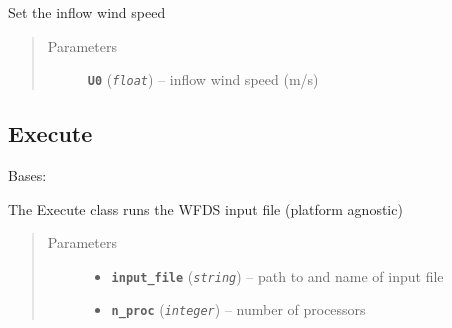\documentclass[letterpaper,10pt,english]{sphinxmanual}
\begin{document}
\begin{fulllineitems}
\begin{fulllineitems}
\begin{quote}
\begin{description}
\end{description}\end{quote}

\end{fulllineitems}


\begin{fulllineitems}
\label{wfds_WFDS:wfds.WFDS.set_wind_speed}
Set the inflow wind speed
\begin{quote}\begin{description}
\item[{Parameters}] \leavevmode
\textbf{\texttt{U0}} (\emph{\texttt{float}}) -- inflow wind speed (m/s)

\end{description}\end{quote}

\end{fulllineitems}


\end{fulllineitems}



\subsection{Execute}
\label{wfds_Execute:execute}\label{wfds_Execute::doc}

\begin{fulllineitems}
\label{wfds_Execute:wfds.Execute}
Bases: 

The Execute class runs the WFDS input file (platform agnostic)
\begin{quote}\begin{description}
\item[{Parameters}] \leavevmode\begin{itemize}
\item {} 
\textbf{\texttt{input\_file}} (\emph{\texttt{string}}) -- path to and name of input file

\item {} 
\textbf{\texttt{n\_proc}} (\emph{\texttt{integer}}) -- number of processors

\end{itemize}

\end{description}\end{quote}

\end{fulllineitems}
\end{document}
